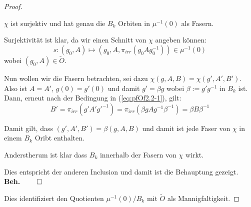 \begin{proof}
\begin{comment}
\\&=g(0)g(0)^{-1}+g(0)(g_i)^{-1}\xi^1+\dots+g(0)(g_k)^{-1}\xi^k
\\&=1+g(0)(g_i)^{-1}\xi^1+\dots+g(0)(g_k)^{-1}\xi^k \in B_k
\end{align*}
\end{comment}
\begin{beh}
$\chi$ ist surjektiv und hat genau die $B_k$ Orbiten in $\mu^{-1}(0)$ als
Fasern.
\end{beh}
Surjektivität ist klar, da wir einen Schnitt von $\chi$ angeben können:
\[
s:(g_0,A)\mapsto (g_0,A,\pi_{irr}(g_0Ag_0^{-1}))\in\mu^{-1}(0)
\]
wobei $(g_0,A)\in\tilde O$.
\begin{comment}
\[
\chi\circ s=\left((g_0,A)\overset s\mapsto(g_0,A,\pi_{irr}(g_0Ag_0^{-1}))
  \overset\chi\mapsto(\underset{=g_0}{\underbrace{g_0(0)}},A)\right)
  =\id_{\mu^{-1}(0)}
\]
\end{comment}
Nun wollen wir die Fasern betrachten, sei dazu $\chi(g,A,B)=\chi(g',A',B')$.
Also ist $A=A'$, $g(0)=g'(0)$ und damit $g'=\beta g$ wobei $\beta:=g'g^{-1}$ in
$B_k$ ist.
Dann, erneut nach der Bedingung in (\ref{eq:pfOf2.2-1}), gilt:
\[
B'=\pi_{irr}(g'A'g'^{-1})=\pi_{irr}(\beta gAg^{-1}\beta^{-1})=\beta B\beta^{-1}
\]
\begin{comment}
\begin{align*}
B'&\overset{(\ref{eq:pfOf2.2-1})}=
  \pi_{irr}(g'A'g'^{-1})  \overset{A'=A}{=}
    \pi_{irr}\left(g'\left(g^{-1}g\right)A\left(g^{-1}g\right)g'^{-1}\right)
    =\pi_{irr}(\beta gAg^{-1}\beta^{-1})
\\& =\beta \pi_{irr}(gAg^{-1}) \beta^{-1}
    \overset{(\ref{eq:pfOf2.2-1})}=\beta B\beta^{-1}
\end{align*}
\end{comment}
Damit gilt, dass $(g',A',B')=\beta(g,A,B)$ und damit ist jede Faser von $\chi$
in einem $B_k$ Oribt enthalten.
\begin{comment}
Also(?):
\begin{align*}
\beta(g,A,B) 
  &\overset{!}=(\beta g,A,\beta B\beta^{-1})
\\&=(g',A',B')
\end{align*}
\end{comment}
Anderstherum ist klar dass $B_k$ innerhalb der Fasern von $\chi$ wirkt.
\begin{comment}
Wie sieht die $B_k$-Wirkung auf $\mu^{-1}(0)$ aus?
Sei $\beta\in B_k$ und $(g,A,B)\in\mu^{-1}(0)$ so...
\end{comment}
Dies entspricht der anderen Inclusion und damit ist die Behauptung gezeigt.
{\hfill \textbf{Beh.} \ensuremath{\qed}}

Dies identifiziert den Quotienten $\mu^{-1}(0)/B_k$ mit $\tilde O$ als
Mannigfaltigkeit.
\begin{comment}
???
\end{comment}

\TODO
\end{proof}

